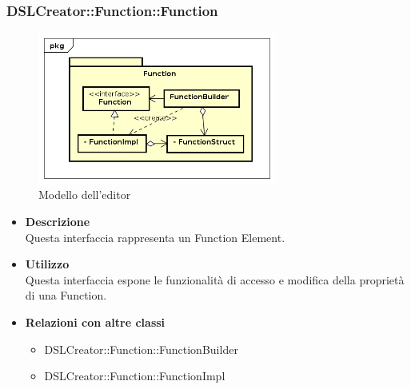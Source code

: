  \subsubsection{DSLCreator::Function::Function}
                 \begin{figure}[H]
                  \centering
                  \includegraphics[width=0.7\textwidth]{res/img/Function.png}
                  \caption{Modello dell'editor}
                  \label{fig:diagram_model}
                \end{figure}
                    \begin{itemize}
                        \item \textbf{Descrizione} \hfill \\
                          Questa interfaccia rappresenta un Function Element. 
                        \item \textbf{Utilizzo} \hfill \\
                          Questa interfaccia espone le funzionalità di accesso e modifica della proprietà di una Function.
                        \item \textbf{Relazioni con altre classi}
                            \begin{itemize}
                              \item DSLCreator::Function::FunctionBuilder
                              \item DSLCreator::Function::FunctionImpl
                            \end{itemize}
                    \end{itemize}  

